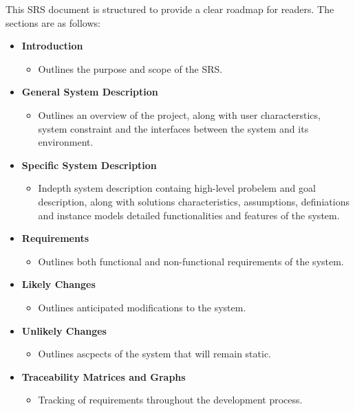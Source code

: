 This SRS document is structured to provide a clear roadmap for readers. The sections are as follows:

\begin{itemize}
    \item \textbf{Introduction} 
    \begin{itemize}
        \item Outlines the purpose and scope of the SRS.
    \end{itemize}
    
    \item \textbf{General System Description} 
    \begin{itemize}
        \item Outlines an overview of the project, along with user characterstics, system constraint and the interfaces between the system and its environment.
    \end{itemize}
    
    \item \textbf{Specific System Description} 
    \begin{itemize}
        \item Indepth system description containg  high-level probelem and goal description, along with solutions characteristics, assumptions, definiations and instance models  detailed functionalities and features of the system.
    \end{itemize}
    
    \item \textbf{Requirements} 
    \begin{itemize}
        \item Outlines both functional and non-functional requirements of the system.
    \end{itemize}
    
    \item \textbf{Likely Changes} 
    \begin{itemize}
        \item Outlines anticipated modifications to the system.
    \end{itemize}
    
    \item \textbf{Unlikely Changes} 
    \begin{itemize}
        \item Outlines ascpects of the system that will remain static.
    \end{itemize}
    
    \item \textbf{Traceability Matrices and Graphs} 
    \begin{itemize}
        \item Tracking of requirements throughout the development process.
    \end{itemize}
    

\end{itemize}
